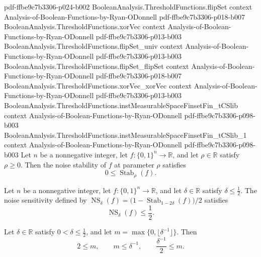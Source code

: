 \begin{lemma}
  {pdf-ffbe9c7b3306-p024-b002}
\proofstep
  {BooleanAnalysis.ThresholdFunctions.flipSet}
  {context}
  {Analysis-of-Boolean-Functions-by-Ryan-ODonnell}
  {pdf-ffbe9c7b3306-p018-b007}
\proofstep
  {BooleanAnalysis.ThresholdFunctions.xorVec}
  {context}
  {Analysis-of-Boolean-Functions-by-Ryan-ODonnell}
  {pdf-ffbe9c7b3306-p013-b003}
\proofstep
  {BooleanAnalysis.ThresholdFunctions.flipSet_univ}
  {context}
  {Analysis-of-Boolean-Functions-by-Ryan-ODonnell}
  {pdf-ffbe9c7b3306-p013-b003}
\proofstep
  {BooleanAnalysis.ThresholdFunctions.flipSet_flipSet}
  {context}
  {Analysis-of-Boolean-Functions-by-Ryan-ODonnell}
  {pdf-ffbe9c7b3306-p018-b007}
\proofstep
  {BooleanAnalysis.ThresholdFunctions.xorVec_xorVec}
  {context}
  {Analysis-of-Boolean-Functions-by-Ryan-ODonnell}
  {pdf-ffbe9c7b3306-p013-b003}
\proofstep
  {BooleanAnalysis.ThresholdFunctions.instMeasurableSpaceFinsetFin_tCSlib}
  {context}
  {Analysis-of-Boolean-Functions-by-Ryan-ODonnell}
  {pdf-ffbe9c7b3306-p098-b003}
\proofstep
  {BooleanAnalysis.ThresholdFunctions.instMeasurableSpaceFinsetFin_tCSlib_1}
  {context}
  {Analysis-of-Boolean-Functions-by-Ryan-ODonnell}
  {pdf-ffbe9c7b3306-p098-b003}
Let $n$ be a nonnegative integer, let $f\colon\{0,1\}^n\to\mathbb R$, and let
$\rho\in\mathbb R$ satisfy $\rho\geq0$. Then the noise stability of $f$ at parameter
$\rho$ satisfies $$0\leq\operatorname{Stab}_{\rho}(f).$$
\end{lemma}

\begin{lemma}
\leanok
{}
Let $n$ be a nonnegative integer, let $f\colon\{0,1\}^n\to\mathbb R$, and let
$\delta\in\mathbb R$ satisfy $\delta\leq\tfrac12$. The noise sensitivity defined by
$\operatorname{NS}_{\delta}(f)=\bigl(1-\operatorname{Stab}_{1-2\delta}(f)\bigr)/2$
satisfies $$\operatorname{NS}_{\delta}(f)\leq\frac12.$$
\end{lemma}

\begin{lemma}
\leanok
{}
Let $\delta\in\mathbb R$ satisfy $0<\delta\leq\tfrac12$, and let
$m=\max\{0,\lfloor\delta^{-1}\rfloor\}$. Then $$2\leq m,\qquad m\leq\delta^{-1},\qquad
\frac{\delta^{-1}}2\leq m.$$
\end{lemma}

